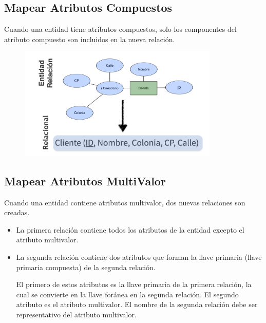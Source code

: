 \documentclass[12pt, fleqn]{report}                             %
\theoremstyle{break}                                            %
\begin{document}
            \subsection{Mapear Atributos Compuestos}

                Cuando una entidad tiene atributos compuestos, solo los componentes del atributo
                compuesto son incluidos en la nueva relación.

                \begin{figure}[h]
                    \centering
                    \includegraphics[width=0.85\textwidth]{MapeoCompuesto}
                \end{figure}


            \clearpage
            \subsection{Mapear Atributos MultiValor}

                Cuando una entidad contiene atributos multivalor, dos nuevas relaciones son creadas.

                \begin{itemize}

                    \item
                        La primera relación contiene todos los atributos de la entidad excepto el
                        atributo multivalor.
                    \item
                        La segunda relación contiene dos atributos que forman la llave primaria
                        (llave primaria compuesta) de la segunda relación.

                        El primero de estos atributos es la llave primaria de la primera relación,
                        la cual se convierte en la llave foránea en la segunda relación.
                        El segundo atributo es el atributo multivalor.
                        El nombre de la segunda relación debe ser representativo del atributo multivalor.

                \end{itemize}  
\end{document}
